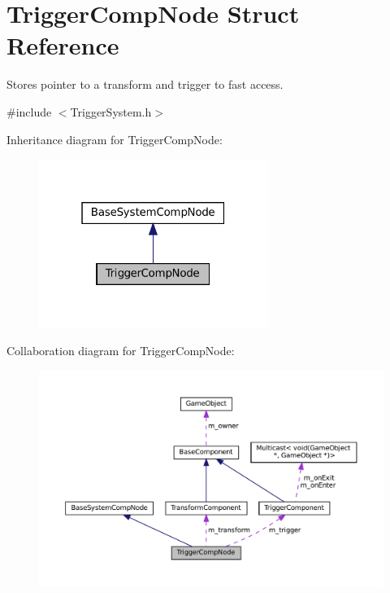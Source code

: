 \hypertarget{structTriggerCompNode}{}\section{Trigger\+Comp\+Node Struct Reference}
\label{structTriggerCompNode}


Stores pointer to a transform and trigger to fast access.  




{\ttfamily \#include $<$Trigger\+System.\+h$>$}



Inheritance diagram for Trigger\+Comp\+Node\+:
\nopagebreak
\begin{figure}[H]
\begin{center}
\leavevmode
\includegraphics[width=211pt]{structTriggerCompNode__inherit__graph}
\end{center}
\end{figure}


Collaboration diagram for Trigger\+Comp\+Node\+:
\nopagebreak
\begin{figure}[H]
\begin{center}
\leavevmode
\includegraphics[width=350pt]{structTriggerCompNode__coll__graph}
\end{center}
\end{figure}
